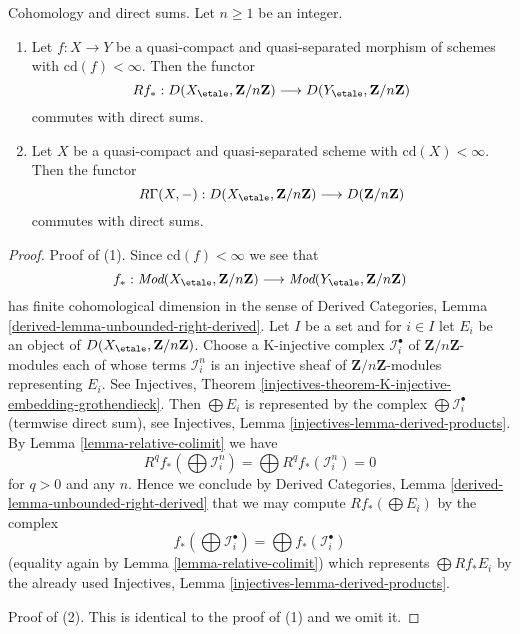 \begin{lemma}
\label{lemma-finite-cd-mod-n-direct-sums}
Cohomology and direct sums. Let $n \geq 1$ be an integer.
\begin{enumerate}
\item Let $f : X \to Y$ be a quasi-compact and quasi-separated morphism
of schemes with $\text{cd}(f) < \infty$. Then the functor
$$
Rf_* :
D(X_\etale, \mathbf{Z}/n\mathbf{Z})
\longrightarrow
D(Y_\etale, \mathbf{Z}/n\mathbf{Z})
$$
commutes with direct sums.
\item Let $X$ be a quasi-compact and quasi-separated scheme with
$\text{cd}(X) < \infty$. Then the functor
$$
R\Gamma(X, -) :
D(X_\etale, \mathbf{Z}/n\mathbf{Z})
\longrightarrow
D(\mathbf{Z}/n\mathbf{Z})
$$
commutes with direct sums.
\end{enumerate}
\end{lemma}

\begin{proof}
Proof of (1). Since $\text{cd}(f) < \infty$ we see that
$$
f_* :
\textit{Mod}(X_\etale, \mathbf{Z}/n\mathbf{Z})
\longrightarrow
\textit{Mod}(Y_\etale, \mathbf{Z}/n\mathbf{Z})
$$
has finite cohomological dimension in the sense of
Derived Categories, Lemma \ref{derived-lemma-unbounded-right-derived}.
Let $I$ be a set and for $i \in I$ let $E_i$ be
an object of $D(X_\etale, \mathbf{Z}/n\mathbf{Z})$.
Choose a K-injective complex $\mathcal{I}_i^\bullet$
of $\mathbf{Z}/n\mathbf{Z}$-modules each of whose
terms $\mathcal{I}_i^n$ is an injective sheaf of
$\mathbf{Z}/n\mathbf{Z}$-modules representing $E_i$.
See Injectives, Theorem
\ref{injectives-theorem-K-injective-embedding-grothendieck}.
Then $\bigoplus E_i$ is represented by the complex
$\bigoplus \mathcal{I}_i^\bullet$ (termwise direct sum), see
Injectives, Lemma \ref{injectives-lemma-derived-products}.
By Lemma \ref{lemma-relative-colimit} we have
$$
R^qf_*(\bigoplus \mathcal{I}_i^n) =
\bigoplus R^qf_*(\mathcal{I}_i^n) = 0
$$
for $q > 0$ and any $n$. Hence we conclude by 
Derived Categories, Lemma \ref{derived-lemma-unbounded-right-derived}
that we may compute $Rf_*(\bigoplus E_i)$ by the complex
$$
f_*(\bigoplus \mathcal{I}_i^\bullet) =
\bigoplus f_*(\mathcal{I}_i^\bullet)
$$
(equality again by Lemma \ref{lemma-relative-colimit}) which
represents $\bigoplus Rf_*E_i$ by the already used
Injectives, Lemma \ref{injectives-lemma-derived-products}.

\medskip\noindent
Proof of (2). This is identical to the proof of (1)
and we omit it.
\end{proof}

